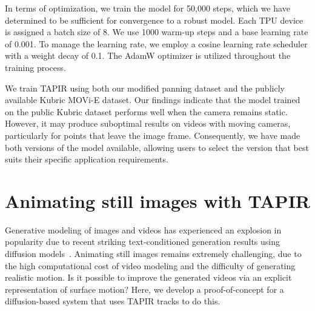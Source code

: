 \documentclass[10pt,twocolumn,letterpaper]{article}
\begin{document}
In terms of optimization, we train the model for 50,000 steps, which we have determined to be sufficient for convergence to a robust model. Each TPU device is assigned a batch size of 8.  We use 1000 warm-up steps and a base learning rate of 0.001. To manage the learning rate, we employ a cosine learning rate scheduler with a weight decay of 0.1. The AdamW optimizer is utilized throughout the training process.

We train TAPIR using both our modified panning dataset and the publicly available Kubric MOVi-E dataset. Our findings indicate that the model trained on the public Kubric dataset performs well when the camera remains static. However, it may produce suboptimal results on videos with moving cameras, particularly for points that leave the image frame. Consequently, we have made both versions of the model available, allowing users to select the version that best suits their specific application requirements.

\begin{table}[t]
\caption{\textbf{Open Sourced TAPIR results on TAP-Vid Benchmark.} Comparing to our major reported model, the open sourced version improves substantially, particularly on RGB-Stacking dataset.}
\label{tab:open_source_model}
\end{table}


\section{Animating still images with TAPIR}


Generative modeling of images and videos has experienced an explosion in popularity due to recent striking text-conditioned generation results using diffusion models~\cite{saharia2022photorealistic, ramesh2022hierarchical, nichol2021glide, gu2022vector, ho2022video}.  Animating still images remains extremely challenging, due to the high computational cost of video modeling and the difficulty of generating realistic motion.  Is it possible to improve the generated videos via an explicit representation of surface motion?  Here, we develop a proof-of-concept for a diffusion-based system that uses TAPIR tracks to do this.  
\end{document}
